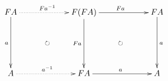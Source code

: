 \documentclass[12pt]{article}
\begin{document}
\pagestyle{empty}

\begin{align*}
  \vcenter{
    \xymatrix@=60pt{
      F A
      \ar@{->}[d]_{a}
      \ar@{.>}[r]^{F a^{-1}}
      \ar@{{}{ }{}}[rd]|{\circlearrowright}
      &
      F (F A)
      \ar@{->}[d]_{F a}
      \ar@{->}[r]^{F a}
      \ar@{{}{ }{}}[rd]|{\circlearrowright}
      &
      F A
      \ar@{->}[d]^{a}
      \\
      A
      \ar@{.>}[r]^{a^{-1}}
      &
      F A
      \ar@{->}[r]^{a}
      &
      A
    }
  }
\end{align*}
\end{document}
